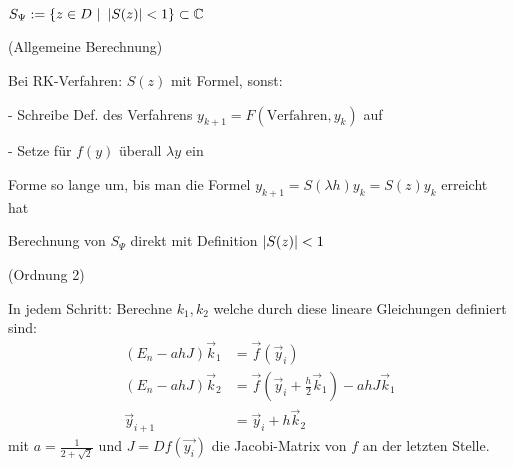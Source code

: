 
$S_{\Psi} := \geschwungeneklammer{z \in D \ | \ \abs{S(z)} < 1} \subset \C$

\vspace{1\baselineskip}


\vspace{1\baselineskip}

(Allgemeine Berechnung)

Bei RK-Verfahren: $S(z)$ mit Formel, sonst:

- Schreibe Def. des Verfahrens $y_{k+1} = F(\text{Verfahren},y_k)$ auf

- Setze für $f(y)$ überall $\lambda y$ ein

Forme so lange um, bis man die Formel $y_{k+1} = S(\lambda h) y_k = S(z) y_k$ erreicht hat

Berechnung von $S_{\Psi}$ direkt mit Definition $\left\vert S(z) \right\vert < 1$

\vspace{1\baselineskip}


\vspace{1\baselineskip}


\vspace{1\baselineskip}

\underline{}

\vspace{1\baselineskip}

 (Ordnung 2)

In jedem Schritt: Berechne $k_1 , k_2$ welche durch diese lineare Gleichungen definiert sind:
\begin{align*}
    (E_n - a h J) \vec{k}_1 &= \vec{f} (\vec{y}_i) \\
    (E_n - a h J) \vec{k}_2 &= \vec{f} (\vec{y}_i + \frac{h}{2} \vec{k}_1) - a h J \vec{k}_1 \\
    \vec{y}_{i+1} &= \vec{y}_i + h \vec{k}_2
\end{align*}
mit $a = \frac{1}{2 + \sqrt{2}}$ und $J = Df(\vec{y_i})$ die Jacobi-Matrix von $f$ an der
letzten Stelle.


